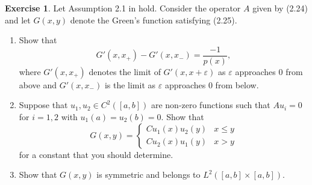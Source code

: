 \documentclass{amsart}
\theoremstyle{plain}
\theoremstyle{definition}
\newtheorem{exer}{Exercise}[section]
\begin{document}
\begin{exer}
    Let Assumption 2.1 in \cite{lord2014introduction} hold. Consider the operator $A$ given by (2.24) and let $G(x,y)$ denote the Green's function satisfying (2.25).
    \begin{enumerate}[label=\alph*.]
        \item Show that 
        $$G'(x,x_{+}) - G'(x,x_{-}) = \frac{-1}{p(x)},$$
        where $G'(x,x_{+})$ denotes the limit of $G'(x,x+\varepsilon)$ as $\varepsilon$ approaches $0$ from above and $G'(x,x_{-})$ is the limit as $\varepsilon$ approaches $0$ from below. 
        \item Suppose that $u_1,u_2 \in C^{2}([a,b])$ are non-zero functions such that $Au_i = 0$ for $i=1,2$ with $u_1(a)=u_2(b) = 0.$ Show that 
        $$G(x,y) = \begin{cases}
            Cu_1(x)u_2(y) & x\leq y\\
            Cu_2(x)u_1(y) & x>y
    \end{cases}$$
    for a constant that you should determine.
    \item Show that $G(x,y)$ is symmetric and belongs to $L^2\left([a,b]\times[a,b]\right).$
    \end{enumerate}
\end{exer}
\end{document}
